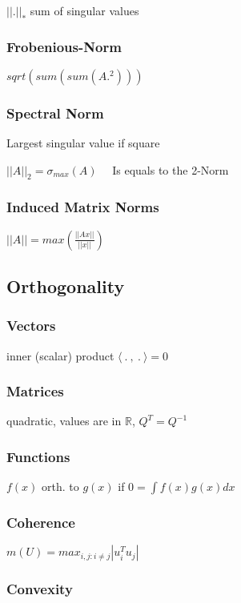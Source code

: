 \documentclass[a4paper,11pt,twocolumn]{article}
\begin{document}
$|| . ||_*$ sum of singular values

\subsubsection{Frobenious-Norm}
$sqrt(sum(sum(A.^2)))$

\subsubsection{Spectral Norm} 
Largest singular value if square 

$||A||_2 = \sigma_{max}(A)$ 
~~Is equals to the 2-Norm

\subsubsection{Induced Matrix Norms}
$ ||A|| = max \left( \frac{ ||Ax|| }{ ||x|| } \right)$

\subsection{Orthogonality}

\subsubsection{Vectors} 

inner (scalar) product $\langle ~.~,~.~ \rangle = 0$

\subsubsection{Matrices} 

quadratic, values are in $\mathbb{R}$, $Q^T = Q^{-1}$

\subsubsection{Functions}

$f(x)$ orth. to $g(x)$ if $0 = \int f(x) g(x) dx $

\subsubsection{Coherence}

$m(U)= max_{i,j:i\neq j} | u_i^T u_j|$

\subsubsection{Convexity}
\end{document}
